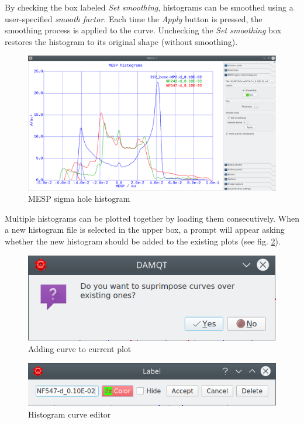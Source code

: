 \documentclass[10pt]{article}
\begin{document}
By checking the box labeled {\it Set smoothing},  
histograms can be smoothed using a user-specified {\it smooth factor}.  
Each time the {\it Apply} button is pressed, the smoothing process is applied to the curve.  
Unchecking the {\it Set smoothing} box restores the histogram to its original shape (without smoothing).  

\begin{figure}[H]
\begin{center}
\includegraphics[width=0.5\linewidth]{damqt320_2D_histogram.png}
\end{center}
\caption{{MESP sigma hole histogram}\label{fig:3_3_1}}
\end{figure}

Multiple histograms can be plotted together by loading them consecutively.  
When a new histogram file is selected in the upper box,  
a prompt will appear asking whether the new histogram should be added  
to the existing plots (see fig. \ref{fig:3_3_2}). 

\begin{minipage}{0.5\linewidth}

\begin{figure}[H]
\begin{center}
\includegraphics[width=0.5\linewidth]{damqt320_2D_histogram_query.png}
\end{center}
\caption{{Adding curve to current plot}\label{fig:3_3_2}}
\end{figure}

\end{minipage}
\begin{minipage}{0.5\linewidth}

\begin{figure}[H]
\begin{center}
\includegraphics[width=\linewidth]{damqt320_2D_histogram_editor.png}
\end{center}
\caption{{Histogram curve editor}\label{fig:3_3_3}}
\end{figure}

\end{minipage}
\end{document}
